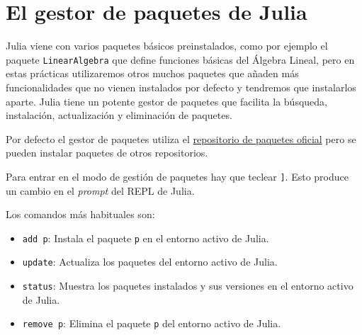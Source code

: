 \documentclass[
  a4paper,
]{scrreport}
\providecommand{\tightlist}{%
  \setlength{\itemsep}{0pt}\setlength{\parskip}{0pt}}\usepackage{longtable,booktabs,array}
\theoremstyle{definition}
\theoremstyle{remark}
\begin{document}
\section{El gestor de paquetes de
Julia}\label{el-gestor-de-paquetes-de-julia}

Julia viene con varios paquetes básicos preinstalados, como por ejemplo
el paquete \texttt{LinearAlgebra} que define funciones básicas del
Álgebra Lineal, pero en estas prácticas utilizaremos otros muchos
paquetes que añaden más funcionalidades que no vienen instalados por
defecto y tendremos que instalarlos aparte. Julia tiene un potente
gestor de paquetes que facilita la búsqueda, instalación, actualización
y eliminación de paquetes.

Por defecto el gestor de paquetes utiliza el
\href{https://julialang.org/packages/}{repositorio de paquetes oficial}
pero se pueden instalar paquetes de otros repositorios.

Para entrar en el modo de gestión de paquetes hay que teclear
\texttt{{]}}. Esto produce un cambio en el \emph{prompt} del REPL de
Julia.

Los comandos más habituales son:

\begin{itemize}
\tightlist
\item
  \texttt{add\ p}: Instala el paquete \texttt{p} en el entorno activo de
  Julia.
\item
  \texttt{update}: Actualiza los paquetes del entorno activo de Julia.
\item
  \texttt{status}: Muestra los paquetes instalados y sus versiones en el
  entorno activo de Julia.
\item
  \texttt{remove\ p}: Elimina el paquete \texttt{p} del entorno activo
  de Julia.
\end{itemize}
\end{document}
